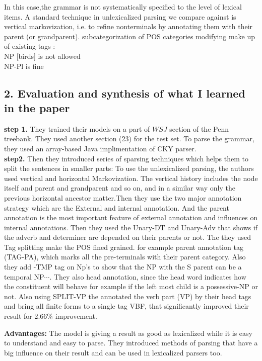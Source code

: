 \documentclass[10pt]{article}
\begin{document}
In this case,the  grammar is not systematically specified to the level of lexical items. A standard technique in unlexicalized parsing we compare against is vertical markovization,
i.e. to refine nonterminals by annotating them with
their parent (or grandparent). subcategorization of POS categories
modifying make up of existing tags :\\
NP [birds] is not allowed\\
NP-Pl  is fine\\

\subsection*{2. Evaluation and synthesis of what I learned in the paper}
\textbf{step 1. }They trained their models on a part of $WSJ$ section of the Penn treebank. They used another section (23) for the test set. To parse the grammar, they used an array-based Java implimentation of CKY parser. \\
\textbf{step2.} Then they introduced series of sparsing techniques which helps them to split the sentences in smaller parts: To use the unlexicalized parsing, the authors used vertical and horizontal Markovization.  The vertical history includes the node itself and parent and grandparent and so on, and in a similar way only the previous horizontal ancestor matter.Then they use the two major annotation strategy which are the External and internal annotation. And the parent annotation is the most important feature of external annotation and influences on internal annotations. Then they used the Unary-DT and Unary-Adv that shows if the adverb and determiner are depended on their parents or not.
The they used Tag splitting make the POS fined grained. for example parent annotation tag (TAG-PA), which marks all the pre-terminals with their parent category. Also they add -TMP tag on Np's to show that the NP with the S parent can be a temporal NP$\cdots$. They also head annotation, since the head word indicates how the constituent will behave for example if the left most child is a possessive-NP or not. Also using SPLIT-VP the annotated the verb part (VP) by their head tags and bring all finite forms to a single tag VBF, that significantly improved their result for $2.66 \%$ improvement.

\textbf{Advantages:} The model is giving a result as good as lexicalized while it is easy to understand and easy to parse. They introduced methods of parsing that have a big influence on their result and can be used in lexicalized parsers too.\\
\end{document}
